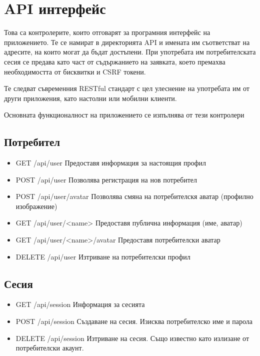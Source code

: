 \section{API интерфейс}
Това са контролерите, които отговарят за програмния
интерфейс на приложението. Те се намират в директорията
API и имената им съответстват на адресите, на които могат
да бъдат достъпени. При употребата им потребителската
сесия се предава като част от съдържанието на заявката,
което премахва необходимостта от бисквитки и CSRF токени.

Те следват съвременния RESTful стандарт с цел улеснение
на употребата им от други приложения, като настолни или
мобилни клиенти.

Основната функционалност на приложението се изпълнява
от тези контролери

\subsection{Потребител}
\begin{itemize}
    \item GET /api/user
        Предоставя информация за настоящия профил
    \item POST /api/user
        Позволява регистрация на нов потребител
    \item POST /api/user/avatar
        Позволява смяна на потребителскя аватар
        (профилно изображение)
    \item GET /api/user/<name>
        Предоставя публична информация (име, аватар)
    \item GET /api/user/<name>/avatar
        Предоставя потребителски аватар
    \item DELETE /api/user
        Изтриване на потребителски профил
\end{itemize}

\subsection{Сесия}
\begin{itemize}
    \item GET /api/session
        Информация за сесията
    \item POST /api/session
        Създаване на сесия.
        Изисква потребителско име и парола
    \item DELETE /api/session
        Изтриване на сесия. Също известно като
        излизане от потребителски акаунт.
\end{itemize}

